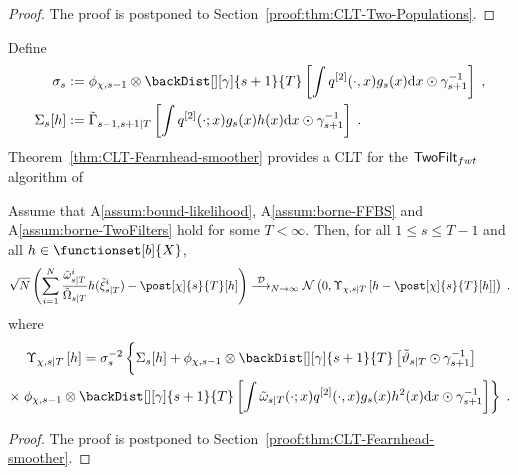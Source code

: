 \begin{proof}
The proof is postponed to Section~\ref{proof:thm:CLT-Two-Populations}.
\end{proof}
Define
\begin{align*}
\sigma_s &\eqdef \filt{\Xinit,s-1} \otimes \backDist[][\gamma]{s+1}{T} \left[ \int  q^{[2]}(\cdot,x) g_s(x) \rmd x \odot \fakeprior_{s+1}^{-1} \right] \eqsp, \\
\Sigma_s[h] &\eqdef \asymVarJoint{s-1,s+1}{T}{\int q^{[2]}(\cdot;x) g_s(x)  h(x) \rmd x \odot \fakeprior_{s+1}^{-1}} \eqsp.
\end{align*}
Theorem~\ref{thm:CLT-Fearnhead-smoother} provides a CLT for the $\mathsf{TwoFilt}_{fwt}$ algorithm of \cite{fearnhead:wyncoll:tawn:2010}
\begin{thm}
\label{thm:CLT-Fearnhead-smoother}
Assume that A\ref{assum:bound-likelihood}, A\ref{assum:borne-FFBS} and A\ref{assum:borne-TwoFilters} hold for some $T<\infty$. Then,  for all $1\le s \le T-1$ and all $h \in \functionset[b]{X}$,
\begin{equation*}
\sqrt{N}\left( \sum_{i=1}^N \frac{\smwght{s}{T}{i}}{\tilde{\Omega}_{s|T}} h(\smpart{s}{T}{i}) - \post[\Xinit]{s}{T}[h]
\right)
\dlim_{N \to \infty} \mathcal{N}\left(0,\asymVarFearnhead[\Xinit]{s}{T}{h - \post[\Xinit]{s}{T}[h]}\right) \eqsp.
\end{equation*}
where
\begin{multline}
\label{eqdef:asymvarfearnhead} 
\asymVarFearnhead[\Xinit]{s}{T}{h}= \sigma_s^{-2} \left\{ \Sigma_s[h] + \filt{\Xinit,s-1} \otimes \backDist[][\gamma]{s+1}{T} \left[\adjfunc[smooth]{s}{T}{} \odot \fakeprior^{-1}_{s+1} \right] \phantom{\int} \right. \\  \times \left.  \filt{\Xinit,s-1} \otimes \backDist[][\gamma]{s+1}{T}\left[ \int \smwghtfunc{s}{T}(\cdot;x) q^{[2]}(\cdot,x) g_s(x) h^2(x) \rmd x \odot \fakeprior^{-1}_{s+1} \right]\right\} \eqsp.
\end{multline}
\end{thm}

\begin{proof}
The proof is postponed to Section~\ref{proof:thm:CLT-Fearnhead-smoother}.
\end{proof}

